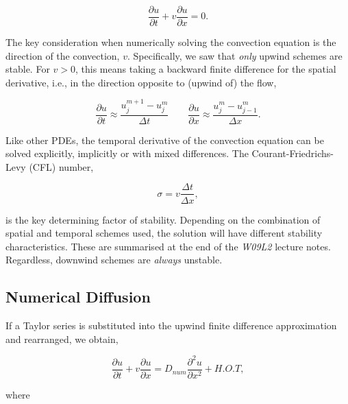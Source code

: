 \documentclass[12pt]{article}
\begin{document}
$$ \frac{\partial u}{\partial t} + v \frac{\partial u}{\partial x} = 0. $$

\vspace{4mm}

The key consideration when numerically solving the convection equation is the direction of the convection, $v$. Specifically, we saw that {\it only} upwind schemes are stable. For $v>0$, this means taking a backward finite difference for the spatial derivative, i.e., in the direction opposite to (upwind of) the flow,

\vspace{2mm}

$$ \frac{\partial u}{\partial t} \approx \frac{u_j^{m+1}-u_j^m}{\Delta t} \hspace{2em}\frac{\partial u}{\partial x} \approx \frac{u_j^{m}-u_{j-1}^m}{\Delta x}.$$

\vspace{4mm}

Like other PDEs, the temporal derivative of the convection equation can be solved explicitly, implicitly or with mixed differences. The Courant-Friedrichs-Levy (CFL) number,

\vspace{2mm}

$$ \sigma = v \frac{\Delta t}{\Delta x}, $$

\vspace{4mm}

is the key determining factor of stability. Depending on the combination of spatial and temporal schemes used, the solution will have different stability characteristics. These are summarised at the end of the {\it W09L2} lecture notes. Regardless, downwind schemes are {\it always} unstable.


\subsection{Numerical Diffusion}

If a Taylor series is substituted into the upwind finite difference approximation and rearranged, we obtain,

\vspace{2mm}

$$ \frac{\partial u}{\partial t} + v \frac{\partial u}{\partial x} = D_{num}\frac{\partial^2 u}{\partial x^2} + H.O.T,$$

\vspace{4mm}

where
\end{document}
